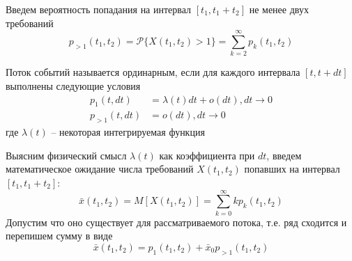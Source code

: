Введем вероятность попадания на интервал $[t_1, t_1 + t_2]$ не менее двух требований
$$p_{>1}(t_1, t_2) = \mathcal{P}\{X(t_1, t_2) > 1\} = \sum_{k=2}^{\infty}{p_k (t_1, t_2)}$$

\begin{definition}
	Поток событий называется {\color{red}ординарным}, если для каждого интервала $[t, t + dt]$ выполнены следующие условия
	\begin{align*}
		p_1 (t, dt) &= \lambda(t) dt + o(dt), dt \to 0 \\
		p_{>1}(t, dt) &= o(dt), dt \to 0
	\end{align*}
	где $\lambda(t)$ -- некоторая интегрируемая функция
\end{definition}

Выясним физический смысл $\lambda(t)$ как коэффициента при $dt$, введем математическое ожидание числа требований $X(t_1, t_2)$ попавших на интервал $[t_1, t_1 + t_2]$:
$$\bar{x}(t_1, t_2) = M[X(t_1, t_2)] = \sum_{k=0}^{\infty}{k p_k (t_1, t_2)}$$
Допустим что оно существует для рассматриваемого потока, т.е. ряд сходится и перепишем сумму в виде
\begin{equation}\label{eq:1}
	\bar{x}(t_1, t_2) = p_1 (t_1, t_2) + \bar{x}_0 p_{>1} (t_1, t_2)
\end{equation}

